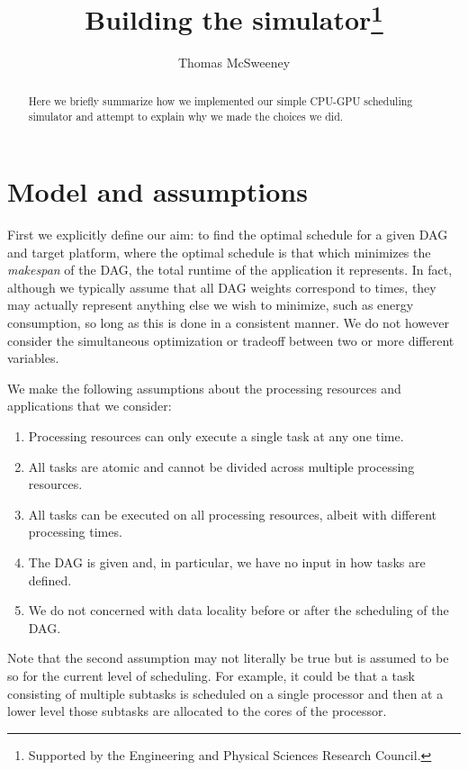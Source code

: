 \documentclass[runningheads]{llncs}
\begin{document}
%
\title{Building the simulator\thanks{Supported by the Engineering and Physical Sciences Research Council.}}
%
%
\author{Thomas McSweeney }
%
%
%
\maketitle              %
%
\begin{abstract}
Here we briefly summarize how we implemented our simple CPU-GPU scheduling simulator and attempt to explain why we made the choices we did.     

\end{abstract}


\section{Model and assumptions}
\label{sect.model_and_assumptions}


First we explicitly define our aim: to find the optimal schedule for a given DAG and target platform, where the optimal schedule is that which minimizes the {\em makespan} of the DAG, the total runtime of the application it represents. In fact, although we typically assume that all DAG weights correspond to times, they may actually represent anything else we wish to minimize, such as energy consumption, so long as this is done in a consistent manner. We do not however consider the simultaneous optimization or tradeoff between two or more different variables.    

We make the following assumptions about the processing resources and applications that we consider:
\begin{enumerate}
	\item Processing resources can only execute a single task at any one time.
	\item All tasks are atomic and cannot be divided across multiple processing resources. 
	\item All tasks can be executed on all processing resources, albeit with different processing times. 
	\item The DAG is given and, in particular, we have no input in how tasks are defined.
	\item We do not concerned with data locality before or after the scheduling of the DAG.
\end{enumerate} 
Note that the second assumption may not literally be true but is assumed to be so for the current level of scheduling. For example, it could be that a task consisting of multiple subtasks is scheduled on a single processor and then at a lower level those subtasks are allocated to the cores of the processor.
\end{document}
